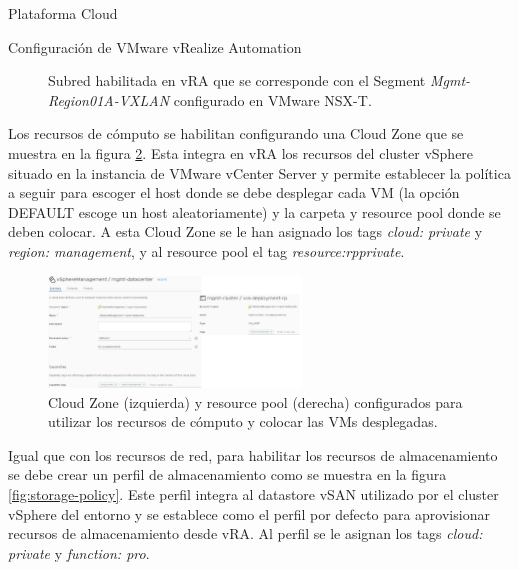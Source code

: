 \begin{subsection}{Plataforma Cloud}
\begin{subsubsection}{Configuración de VMware vRealize Automation}
\begin{figure}[h]
            \caption{Subred habilitada en vRA que se corresponde con el Segment \textit{Mgmt-Region01A-VXLAN} configurado en VMware NSX-T.}
            \label{fig:net-profile}
        \end{figure}
        \FloatBarrier
        Los recursos de cómputo se habilitan configurando una Cloud Zone que se muestra en la figura \ref{fig:cloud-zone}. Esta integra en vRA los recursos del cluster vSphere situado en la instancia de VMware vCenter Server y permite establecer la política a seguir para escoger el host donde se debe desplegar cada VM (la opción DEFAULT escoge un host aleatoriamente) y la carpeta y resource pool donde se deben colocar. A esta Cloud Zone se le han asignado los tags \textit{cloud: private} y \textit{region: management}, y al resource pool el tag \textit{resource:rpprivate}.
       \begin{figure}[h]
            \centering
            \includegraphics[width=0.6\textwidth]{imaxes/pruebaconcepto/vrealize/cloud-zone.png}
            \caption{Cloud Zone (izquierda) y resource pool (derecha) configurados para utilizar los recursos de cómputo y colocar las VMs desplegadas.}
            \label{fig:cloud-zone}
        \end{figure}
        \FloatBarrier
        Igual que con los recursos de red, para habilitar los recursos de almacenamiento se debe crear un perfil de almacenamiento como se muestra en la figura \ref{fig:storage-policy}. Este perfil integra al datastore vSAN utilizado por el cluster vSphere del entorno y se establece como el perfil por defecto para aprovisionar recursos de almacenamiento desde vRA. Al perfil se le asignan los tags \textit{cloud: private} y \textit{function: pro}.
        \begin{figure}[h]
            \centering

\end{figure}
\end{subsubsection}
\end{subsection}
